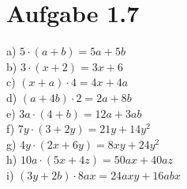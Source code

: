 \documentclass[a4paper, 10pt]{scrartcl}
\begin{document}
\section{Aufgabe 1.7}

a) $5\cdot(a + b) = 5a + 5b$\\
b) $3\cdot(x + 2) = 3x + 6$\\
c) $(x + a)\cdot 4 = 4x + 4a$\\
d) $(a + 4b)\cdot 2 = 2a + 8b$\\
e) $3a\cdot(4 + b) = 12a + 3ab$\\
f) $7y\cdot(3 + 2y) = 21y + 14y^{2}$\\
g) $4y\cdot(2x + 6y) = 8xy + 24y^{2}$\\
h) $10a\cdot(5x + 4z) = 50ax + 40az$\\
i) $(3y + 2b)\cdot 8ax = 24axy + 16abx$\\
\end{document}
